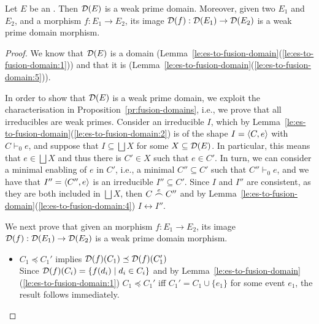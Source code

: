 \begin{proposition}
  \label{pr:es-to-dom}
  Let ${E}$ be an {\esabbr}.
  Then $\mathcal{D}({{E}})$
  is a weak prime domain. Moreover, given two {\esabbr} $E_1$ and $E_2$, and  a morphism
  $f : {E}_1 \to {E}_2$, its image
  $\mathcal{D}({f}) : \mathcal{D}({{E}_1}) \to \mathcal{D}({{E}_2})$ is a weak prime domain morphism.
\end{proposition}

\begin{proof}
  We know that
  $\mathcal{D}({{E}})$ is a domain
  (Lemma~\ref{le:es-to-fusion-domain}(\ref{le:es-to-fusion-domain:1}))
  and that it is {\wi}
  (Lemma~\ref{le:es-to-fusion-domain}(\ref{le:es-to-fusion-domain:5})).
%  

  In order to show that $\mathcal{D}({{E}})$ is a weak prime domain, we
  exploit the characterisation in Proposition~\ref{pr:fusion-domains},
  i.e., we prove that all irreducibles are weak primes.
  Consider an irreducible $I$, which by
  Lemma~\ref{le:es-to-fusion-domain}(\ref{le:es-to-fusion-domain:2})
  is of the shape $I = \langle{C}, {e}\rangle$ with $C \vdash_0 e$, and suppose that
  $I \subseteq \bigsqcup X$ for some
  $X \subseteq \mathcal{D}({{E}})$.
  In particular, this means that $e \in \bigsqcup X$ and thus there is
  $C' \in X$ such that $e \in C'$.  In turn, we can consider a minimal
  enabling of $e$ in $C'$, i.e., a minimal $C'' \subseteq C'$ such
  that $C'' \vdash_0 e$, and we have that $I'' = \langle{C''}, {e}\rangle$ is an
  irreducible $I'' \subseteq C'$. Since $I$ and $I''$ are consistent,
  as they are both included in $\bigsqcup X$, then $C \stackrel{e}{\frown} C''$
  and by
  Lemma~\ref{le:es-to-fusion-domain}(\ref{le:es-to-fusion-domain:4})
  $I \leftrightarrow I''$.

  \bigskip
  
  We next prove that given an {\esabbr} morphism
  $f : {E}_1 \to {E}_2$, its image
  $\mathcal{D}({f}) : \mathcal{D}({{E}_1}) \to \mathcal{D}({{E}_2})$ is a weak prime
  domain morphism.
  \begin{itemize}
  \item $C_1 \preceq C_1'$ implies $\mathcal{D}({f})(C_1) \preceq \mathcal{D}({f})(C_1')$\\  
    Since $\mathcal{D}({f})(C_i) = \{ f(d_i) \mid d_i \in C_i \}$ and by
    Lemma~\ref{le:es-to-fusion-domain}(\ref{le:es-to-fusion-domain:1})
    $C_1 \preceq C_1'$ iff $C_1' = C_1 \cup \{ e_1 \}$ for some event
    $e_1$, the result
    follows immediately.\\


\end{itemize}
\end{proof}
